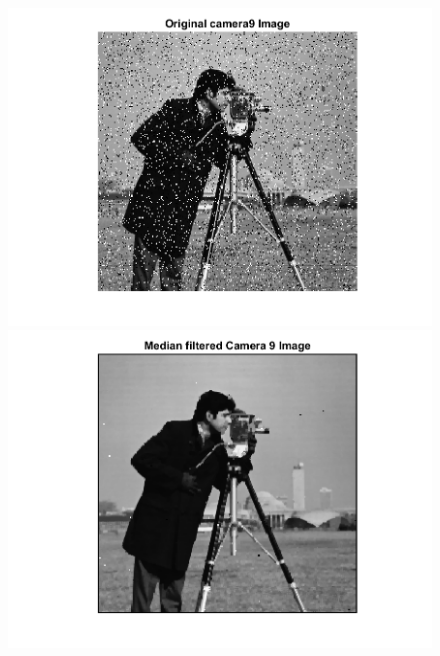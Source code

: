 \documentclass[11pt]{article} %
\begin{document}
\begin{figure}
 \centering
	\includegraphics{2aa.png}
	\includegraphics{2ab.png}
\end{figure}
\end{document}
